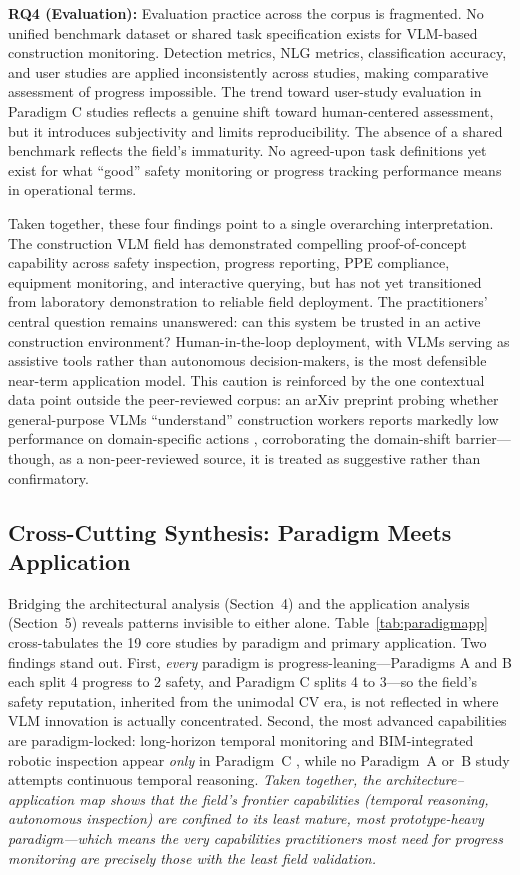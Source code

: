 \documentclass[10pt,letterpaper]{article}
\begin{document}
\textbf{RQ4 (Evaluation):} Evaluation practice across the corpus is fragmented. No unified benchmark dataset or shared task specification exists for VLM-based construction monitoring. Detection metrics, NLG metrics, classification accuracy, and user studies are applied inconsistently across studies, making comparative assessment of progress impossible. The trend toward user-study evaluation in Paradigm C studies reflects a genuine shift toward human-centered assessment, but it introduces subjectivity and limits reproducibility. The absence of a shared benchmark reflects the field's immaturity. No agreed-upon task definitions yet exist for what ``good'' safety monitoring or progress tracking performance means in operational terms.

Taken together, these four findings point to a single overarching interpretation. The construction VLM field has demonstrated compelling proof-of-concept capability across safety inspection, progress reporting, PPE compliance, equipment monitoring, and interactive querying, but has not yet transitioned from laboratory demonstration to reliable field deployment. The practitioners' central question remains unanswered: can this system be trusted in an active construction environment? Human-in-the-loop deployment, with VLMs serving as assistive tools rather than autonomous decision-makers, is the most defensible near-term application model. This caution is reinforced by the one contextual data point outside the peer-reviewed corpus: an arXiv preprint probing whether general-purpose VLMs ``understand'' construction workers reports markedly low performance on domain-specific actions \cite{bui2026}, corroborating the domain-shift barrier---though, as a non-peer-reviewed source, it is treated as suggestive rather than confirmatory.

\subsection{Cross-Cutting Synthesis: Paradigm Meets Application}

Bridging the architectural analysis (Section~4) and the application analysis (Section~5) reveals patterns invisible to either alone. Table~\ref{tab:paradigmapp} cross-tabulates the 19 core studies by paradigm and primary application. Two findings stand out. First, \emph{every} paradigm is progress-leaning---Paradigms A and B each split 4 progress to 2 safety, and Paradigm C splits 4 to 3---so the field's safety reputation, inherited from the unimodal CV era, is not reflected in where VLM innovation is actually concentrated. Second, the most advanced capabilities are paradigm-locked: long-horizon temporal monitoring and BIM-integrated robotic inspection appear \emph{only} in Paradigm~C \cite{jeoung2025,tuomisto2026}, while no Paradigm~A or~B study attempts continuous temporal reasoning. \textit{Taken together, the architecture--application map shows that the field's frontier capabilities (temporal reasoning, autonomous inspection) are confined to its least mature, most prototype-heavy paradigm---which means the very capabilities practitioners most need for progress monitoring are precisely those with the least field validation.}
\end{document}
